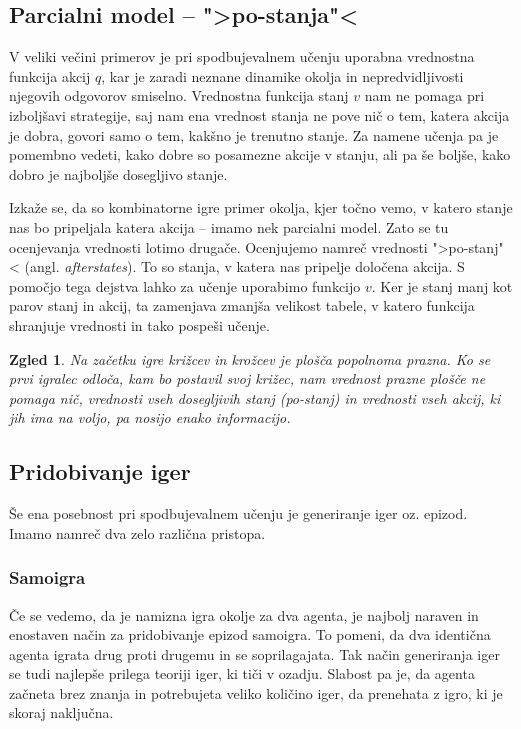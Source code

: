 \documentclass[12pt,a4paper]{amsart}
\theoremstyle{definition} %
\theoremstyle{plain} %
\newtheorem{zgled}[definicija]{Zgled}
\begin{document}
\subsection{Parcialni model -- ">po-stanja"<}
V veliki večini primerov je pri spodbujevalnem učenju uporabna vrednostna funkcija akcij $q$, 
kar je zaradi neznane dinamike okolja in nepredvidljivosti njegovih odgovorov smiselno. Vrednostna 
funkcija stanj $v$ nam ne pomaga pri izboljšavi strategije, saj nam ena vrednost stanja ne pove 
nič o tem, katera akcija je dobra, govori samo o tem, kakšno je trenutno stanje. Za namene učenja 
pa je pomembno vedeti, kako dobre so posamezne akcije v stanju, ali pa še boljše, kako dobro je 
najboljše dosegljivo stanje. 
 
Izkaže se, da so kombinatorne igre primer okolja, kjer točno vemo, v katero stanje nas bo pripeljala 
katera akcija -- imamo nek parcialni model. Zato se tu ocenjevanja vrednosti lotimo drugače. Ocenjujemo 
namreč vrednosti ">po-stanj"< (angl. \textit{afterstates}). To so stanja, v katera nas pripelje 
določena akcija. S pomočjo tega dejstva lahko za učenje uporabimo funkcijo $v$. Ker je stanj manj 
kot parov stanj in akcij, ta zamenjava zmanjša velikost tabele, v katero funkcija shranjuje vrednosti 
in tako pospeši učenje.

\begin{zgled}
    Na začetku igre križcev in krožcev je plošča popolnoma prazna. Ko se prvi igralec odloča, kam bo 
    postavil svoj križec, nam vrednost prazne plošče ne pomaga nič, vrednosti vseh dosegljivih stanj 
    (po-stanj) in vrednosti vseh akcij, ki jih ima na voljo, pa nosijo enako informacijo.
\end{zgled}

\subsection{Pridobivanje iger}
Še ena posebnost pri spodbujevalnem učenju je generiranje iger oz. epizod. Imamo namreč dva zelo 
različna pristopa. 

\subsubsection{Samoigra}
Če se vedemo, da je namizna igra okolje za dva agenta, je najbolj naraven in enostaven način za 
pridobivanje epizod samoigra. To pomeni, da dva identična agenta igrata drug proti drugemu in se 
soprilagajata. Tak način generiranja iger se tudi najlepše prilega teoriji iger, ki tiči v ozadju. 
Slabost pa je, da agenta začneta brez znanja in potrebujeta veliko količino iger, da prenehata z 
igro, ki je skoraj naključna.
\end{document}
